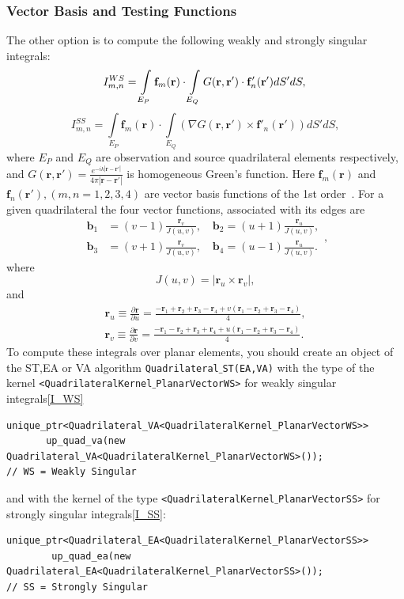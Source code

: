 \documentclass[a4wide,11pt]{article}
\renewcommand{\[}{\begin{equation}}
\renewcommand{\]}{\end{equation}}
\renewcommand{\{}{\begin{eqnarray}}
\renewcommand{\}}{\end{eqnarray}}
\renewcommand{\vec}{\mathbf}
\begin{document}
\subsubsection*{Vector Basis and Testing Functions}
The other option is to compute the following weakly and strongly singular integrals:
\[
\label{I_WS}
I^{WS}_{m,n} = \int\limits_{E_P} \vec f_m(\vec r) \cdot\int\limits_{E_Q}  G(\vec r, \vec r') \cdot\vec f'_n(\vec r') dS' dS,\\
\]
\[
\label{I_SS}
I^{SS}_{m,n} = \int\limits_{E_P} \vec f_m(\vec r) \cdot\int\limits_{E_Q} (\nabla G(\vec r, \vec r') \times \vec f'_n(\vec r')) dS' dS,
\]
where $E_P$ and $E_Q$ are observation and source quadrilateral elements respectively, and $G(\vec r, \vec r') = \frac{e^{-ik|\vec r - \vec r'|}}{4\pi |\vec r - \vec r'|}$ is homogeneous Green's function.
Here $\vec f_m(\vec r )$ and $\vec f_n (\vec r'), (m,n = 1,2,3,4)$ are vector basis functions of the 1st order~\cite{Jin2014,Djordjevic2004}. For a given quadrilateral the four vector functions, associated with its edges are
\[
\label{vector_f}
\begin{aligned}
\vec b_1 &= (v-1)\frac{\vec r_v}{J(u,v)}, \quad \vec b_2 = (u+1)\frac{\vec r_u}{J(u,v)},\\
\vec b_3 &= (v+1)\frac{\vec r_v}{J(u,v)}, \quad \vec b_4 = (u-1)\frac{\vec r_u}{J(u,v)}.
\end{aligned},
\] 
where 
\[
\label{geom_Jacobian}
J(u,v) = |\vec r_u \times \vec r_v |,
\]
and 
\{
\label{derivatives}
\vec r_u \equiv \frac{\partial \vec r}{\partial u}= \frac {-\vec r_1 + \vec r_2 + \vec r_3 - \vec r_4 + v\left(\vec r_1 - \vec r_2 + \vec r_3 - \vec r_4\right)}4,\\
\vec r_v \equiv \frac{\partial \vec r}{\partial v} = \frac{-\vec r_1 - \vec r_2 + \vec r_3 + \vec r_4 + u\left(\vec r_1 - \vec r_2 + \vec r_3 - \vec r_4\right)}4.
\}
To compute these integrals over planar elements, you should create an object of the ST,EA or VA algorithm \texttt{Quadrilateral$\_$ST(EA,VA)} with the type of the kernel \texttt{<QuadrilateralKernel$\_$PlanarVectorWS>} for weakly singular integrals\eqref{I_WS}
\begin{verbatim}
unique_ptr<Quadrilateral_VA<QuadrilateralKernel_PlanarVectorWS>> 
       up_quad_va(new Quadrilateral_VA<QuadrilateralKernel_PlanarVectorWS>());
// WS = Weakly Singular
\end{verbatim}
and with the kernel of the type \texttt{<QuadrilateralKernel$\_$PlanarVectorSS>} for strongly singular integrals\eqref{I_SS}:
\begin{verbatim}
unique_ptr<Quadrilateral_EA<QuadrilateralKernel_PlanarVectorSS>> 
        up_quad_ea(new Quadrilateral_EA<QuadrilateralKernel_PlanarVectorSS>());
// SS = Strongly Singular
\end{verbatim}
\end{document}

